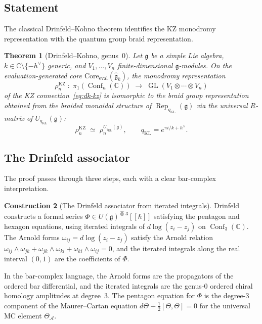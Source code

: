 \documentclass[11pt,reqno]{amsart}
\newtheorem{theorem}{Theorem}[section]
\theoremstyle{definition}
\newtheorem{construction}[theorem]{Construction}
\theoremstyle{remark}
\newcommand{\cA}{\mathcal{A}}
\DeclareMathOperator{\Conf}{Conf}
\DeclareMathOperator{\Rep}{Rep}
\DeclareMathOperator{\GL}{GL}
\newcommand{\fg}{\mathfrak{g}}
\newcommand{\CC}{\mathbb{C}}
\newcommand{\hv}{h^{\vee}}
\newcommand{\kp}{k + h^{\vee}}
\numberwithin{equation}{section}
\begin{document}
\subsection{Statement}

The classical Drinfeld--Kohno theorem identifies the KZ
monodromy representation with the quantum group braid
representation.

\begin{theorem}[Drinfeld--Kohno, genus~$0$]
\label{thm:dk0}
Let $\fg$ be a simple Lie algebra,
$k \in \CC \setminus \{-\hv\}$ generic, and
$V_1, \ldots, V_n$ finite-dimensional $\fg$-modules.
On the evaluation-generated core
${\mathrm{Core}}_{\mathrm{eval}}(\widehat{\mathfrak{g}}_k)$,
the monodromy representation
\[
\rho_n^{\mathrm{KZ}}
\;\colon\;
\pi_1(\Conf_n(\CC))
\;\longrightarrow\;
\GL(V_1 \otimes \cdots \otimes V_n)
\]
of the KZ connection~\eqref{eq:dk-kz} is isomorphic to
the braid group representation obtained from the braided
monoidal structure of $\Rep_{q_{\mathrm{KL}}}(\fg)$ via the universal
$R$-matrix of $U_{q_{\mathrm{KL}}}(\fg)$:
\begin{equation}\label{eq:dk0}
\rho_n^{\mathrm{KZ}}
\;\simeq\;
\rho_n^{U_{q_{\mathrm{KL}}}(\fg)},
\qquad q_{\mathrm{KL}}=e^{\pi i/\kp}.
\end{equation}
\end{theorem}

\subsection{The Drinfeld associator}

The proof passes through three steps, each with a clear
bar-complex interpretation.

\begin{construction}[The Drinfeld associator from iterated integrals]
\label{constr:dk-associator}
Drinfeld constructs a formal series
$\Phi \in U(\fg)^{\widehat{\otimes}\,3}[\![\hbar]\!]$
satisfying the pentagon and hexagon equations, using
iterated integrals of $d\log(z_i - z_j)$ on
$\Conf_3(\CC)$.  The Arnold forms
$\omega_{ij} = d\log(z_i - z_j)$ satisfy the Arnold
relation
$\omega_{ij} \wedge \omega_{jk}
+ \omega_{jk} \wedge \omega_{ki}
+ \omega_{ki} \wedge \omega_{ij} = 0$,
and the iterated integrals along the real interval
$(0, 1)$ are the coefficients of $\Phi$.

In the bar-complex language, the Arnold forms are the
propagators of the ordered bar differential, and the
iterated integrals are the genus-$0$ ordered chiral
homology amplitudes at degree~$3$.  The pentagon equation
for $\Phi$ is the degree-$3$ component of the
Maurer--Cartan equation
$d\Theta + \tfrac{1}{2}[\Theta, \Theta] = 0$
for the universal MC element $\Theta_\cA$.
\end{construction}
\end{document}
